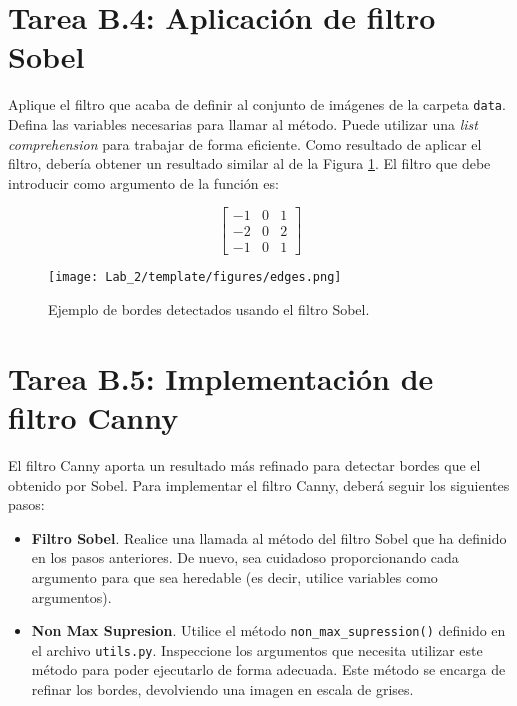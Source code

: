 \section*{Tarea B.4: Aplicación de filtro Sobel}
{}

Aplique el filtro que acaba de definir al conjunto de imágenes de la carpeta \texttt{data}. Defina las variables necesarias para llamar al método. Puede utilizar una \textit{list comprehension} para trabajar de forma eficiente. Como resultado de aplicar el filtro, debería obtener un resultado similar al de la Figura \ref{fig:edges}. El filtro que debe introducir como argumento de la función es:

\[
\begin{bmatrix}
-1 & 0 & 1 \\
-2 & 0 & 2 \\
-1 & 0 & 1
\end{bmatrix}
\]


\begin{figure}[H]
    \centering
    \texttt{[image: Lab\_2/template/figures/edges.png]}
    \caption{Ejemplo de bordes detectados usando el filtro Sobel.}
    \label{fig:edges}
\end{figure}

\section*{Tarea B.5: Implementación de filtro Canny}
{}
El filtro Canny aporta un resultado más refinado para detectar bordes que el obtenido por Sobel. Para implementar el filtro Canny, deberá seguir los siguientes pasos:

\begin{itemize}
    \item \textbf{Filtro Sobel}. Realice una llamada al método del filtro Sobel que ha definido en los pasos anteriores. De nuevo,  sea cuidadoso proporcionando cada argumento para que sea heredable (es decir, utilice variables como argumentos).
    \item \textbf{Non Max Supresion}. Utilice el método \texttt{non\_max\_supression()} definido en el archivo \texttt{utils.py}. Inspeccione los argumentos que necesita utilizar este método para poder ejecutarlo de forma adecuada. Este método se encarga de refinar los bordes, devolviendo una imagen en escala de grises. 
\end{itemize}

